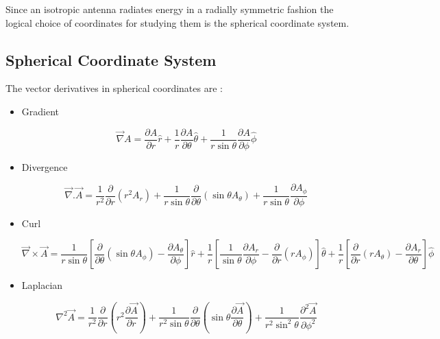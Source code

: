 Since an isotropic antenna radiates energy in a radially symmetric fashion the logical choice of coordinates for studying them is the spherical coordinate system.

\subsection{Spherical Coordinate System}

The vector derivatives in spherical coordinates are \cite{anton2002calculus}:

\begin{itemize}

   \item Gradient

      \begin{equation}
      \vec{\nabla} A = \frac{\partial A}{\partial r}\hat{r}+\frac{1}{r}\frac{\partial A}{\partial \theta}\hat{\theta}+\frac{1}{r\sin\theta}\frac{\partial A}{\partial \phi}\hat{\phi}
      \end{equation}


   \item Divergence

      \begin{equation}\label{divergence}
      \vec{\nabla}.\vec{A} = \frac{1}{r^2}\frac{\partial}{\partial r}(r^2A_r)+\frac{1}{r\sin\theta}\frac{\partial}{\partial\theta}(\sin\theta A_\theta)+\frac{1}{r\sin\theta}\frac{\partial A_\phi}{\partial\phi}
      \end{equation}

   \item Curl

      \begin{equation}
      \vec{\nabla}\times\vec{A} = \frac{1}{r\sin\theta}\left[\frac{\partial}{\partial\theta}(\sin\theta A_\phi)-\frac{\partial A_\theta}{\partial\phi}\right]\hat{r}+\frac{1}{r}\left[\frac{1}{\sin\theta}\frac{\partial A_r}{\partial\phi}-\frac{\partial}{\partial r}(rA_\phi)\right]\hat{\theta}+\frac{1}{r}\left[\frac{\partial}{\partial r}(rA_\theta)-\frac{\partial A_r}{\partial \theta}\right]\hat{\phi}
      \end{equation}

   \item Laplacian

      \begin{equation}\label{laplacian}
      \nabla^2 \vec{A} = \frac{1}{r^2}\frac{\partial}{\partial r}(r^2\frac{\partial\vec{A}}{\partial r})+\frac{1}{r^2\sin\theta}\frac{\partial}{\partial\theta}(\sin\theta\frac{\partial\vec{A}}{\partial \theta})+\frac{1}{r^2\sin^2\theta}\frac{\partial^2\vec{A}}{\partial \phi^2}
      \end{equation}

\end{itemize}

